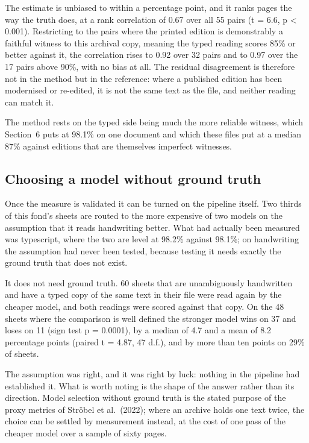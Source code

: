 \documentclass[11pt,a4paper]{article}
\begin{document}
The estimate is unbiased to within a percentage point, and it ranks pages the
way the truth does, at a rank correlation of 0.67 over all 55 pairs (t = 6.6,
p \textless{} 0.001). Restricting to the pairs where the printed edition is
demonstrably a faithful witness to this archival copy, meaning the typed
reading scores 85\% or better against it, the correlation rises to 0.92 over 32
pairs and to 0.97 over the 17 pairs above 90\%, with no bias at all. The
residual disagreement is therefore not in the method but in the reference:
where a published edition has been modernised or re-edited, it is not the same
text as the file, and neither reading can match it.

The method rests on the typed side being much the more reliable witness, which
Section~6 puts at 98.1\% on one document and which these files put at a median
87\% against editions that are themselves imperfect witnesses.

\subsection{Choosing a model without ground truth}\label{choosing-a-model-without-ground-truth}

Once the measure is validated it can be turned on the pipeline itself. Two
thirds of this fond's sheets are routed to the more expensive of two models on
the assumption that it reads handwriting better. What had actually been
measured was typescript, where the two are level at 98.2\% against 98.1\%; on
handwriting the assumption had never been tested, because testing it needs
exactly the ground truth that does not exist.

It does not need ground truth. 60 sheets that are unambiguously handwritten
and have a typed copy of the same text in their file were read again by the
cheaper model, and both readings were scored against that copy. On the 48
sheets where the comparison is well defined the stronger model wins on 37 and
loses on 11 (sign test p = 0.0001), by a median of 4.7 and a mean of 8.2
percentage points (paired t = 4.87, 47 d.f.), and by more than ten points on
29\% of sheets.

The assumption was right, and it was right by luck: nothing in the pipeline
had established it. What is worth noting is the shape of the answer rather
than its direction. Model selection without ground truth is the stated purpose
of the proxy metrics of Ströbel et al.~(2022); where an archive holds one text
twice, the choice can be settled by measurement instead, at the cost of one
pass of the cheaper model over a sample of sixty pages.
\end{document}
